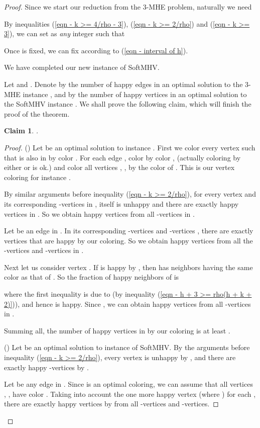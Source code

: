 \documentclass[11pt]{article}
\newtheorem{claim}{Claim}
\begin{document}
\begin{proof}
Since we start our reduction from the 3-MHE problem, naturally we need


By inequalities (\ref{eqn - k >= 4/rho - 3}), (\ref{eqn - k >= 2/rho}) and
(\ref{eqn - k >= 3}), we can set  as {\em any} integer such that

Once  is fixed, we can fix  according to (\ref{eqn - interval of h}).

We have completed our new instance  of SoftMHV.

Let  and .
Denote by  the number of happy edges in an optimal solution to
the 3-MHE instance , and by  the number of happy vertices
in an optimal solution to the SoftMHV instance .
We shall prove the following claim, which will finish the proof of the
theorem.

\begin{claim}
.
\end{claim}
\begin{proof}
()
Let  be an optimal solution to instance .
First we color every vertex  such that  is also in 
by color . For each edge , color 
by color , (actually coloring  by either  or
 is ok.) and color all vertices , , 
by the color of . This is our vertex coloring for instance .

By similar arguments before inequality
(\ref{eqn - k >= 2/rho}), for every vertex  and its
corresponding -vertices in ,  itself is unhappy and
there are exactly  happy vertices in
.
So we obtain  happy vertices from all -vertices in .

Let  be an edge in . In its corresponding
-vertices  and
-vertices ,
there are exactly  vertices that are happy by our coloring.
So we obtain  happy vertices from all the -vertices
and -vertices in .

Next let us consider vertex . If  is happy by ,
then  has  neighbors having the same color as that of .
So the fraction of happy neighbors of  is

where the first inequality is due to 
(by inequality (\ref{eqn - h + 3 >= rho(h + k + 2)})),
and hence  is happy.
Since , we can obtain  happy vertices from
all -vertices in .

Summing all, the number of happy vertices in  by our coloring
is at least .

()
Let  be an optimal solution to instance  of SoftMHV.
By the arguments before inequality (\ref{eqn - k >= 2/rho}),
every vertex  is unhappy by ,
and there are exactly  happy -vertices by .

Let  be any edge in . Since  is an optimal coloring,
we can assume that all vertices , ,  have
color . Taking into account the one more happy vertex
 (where ) for each ,
there are exactly  happy vertices by  from all
-vertices and -vertices.


\end{proof}
\end{proof}
\end{document}
